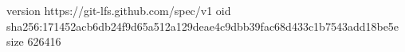 version https://git-lfs.github.com/spec/v1
oid sha256:171452acb6db24f9d65a512a129deae4c9dbb39fac68d433c1b7543add18be5e
size 626416
